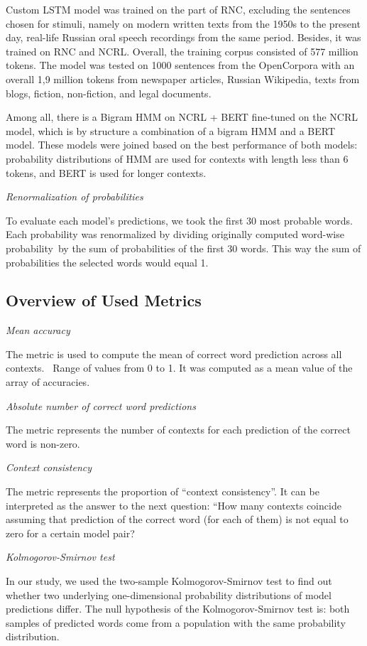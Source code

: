 \documentclass[a4paper]{article}
\newcommand{\head}[1]{\vspace{0.5em}\emph{#1}\vspace{0.25em}}
\begin{document}
Custom LSTM model was trained on the part of RNC, excluding the sentences chosen for stimuli, namely on modern written texts from the 1950s to the present day, real-life Russian oral speech recordings from the same period. Besides, it was trained on RNC and NCRL. Overall, the training corpus consisted of 577 million tokens. The model was tested on 1000 sentences from the OpenCorpora \cite{bocharov:2011} with an overall 1,9 million tokens from newspaper articles, Russian Wikipedia, texts from blogs, fiction, non-fiction, and legal documents. 

Among all, there is a Bigram HMM on NCRL + BERT fine-tuned on the NCRL model, which is by structure a combination of a bigram HMM and a BERT model. These models were joined based on the best performance of both models: probability distributions of HMM are used for contexts with length less than 6 tokens, and BERT is used for longer contexts. 

\head{Renormalization of probabilities}

To evaluate each model’s predictions, we took the first 30 most probable words. Each probability was renormalized by dividing originally computed word-wise probability by the sum of probabilities of the first 30 words. This way the sum of probabilities the selected words would equal 1.

\subsection{Overview of Used Metrics}

\head{Mean accuracy}

The metric is used to compute the mean of correct word prediction across all contexts.  Range of values from 0 to 1. It was computed as a mean value of the array of accuracies.

\head{Absolute number of correct word predictions}

The metric represents the number of contexts for each prediction of the correct word is non-zero. 

\head{Context consistency}

The metric represents the proportion of “context consistency”. It can be interpreted as the answer to the next question: “How many contexts coincide assuming that prediction of the correct word (for each of them) is not equal to zero for a certain model pair?

\head{Kolmogorov-Smirnov test}

In our study, we used the two-sample Kolmogorov-Smirnov test to find out whether two underlying one-dimensional probability distributions of model predictions differ. The null hypothesis of the Kolmogorov-Smirnov test is: both samples of predicted words come from a population with the same probability distribution. 
\end{document}
